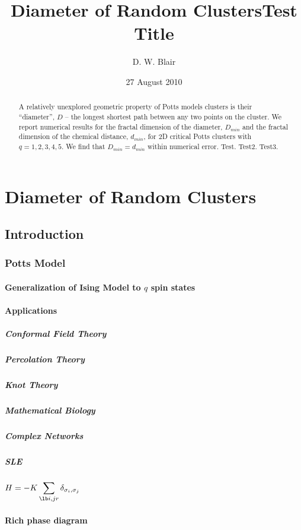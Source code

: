 \documentclass[pre,preprint]{revtex4-1}
\title{Diameter of Random Clusters}
\date{27 August 2010}
\begin{document}
\begin{abstract}
 A relatively unexplored geometric property of Potts models clusters is their ``diameter'', $D$ -- the longest shortest path between any two points on the cluster. We report numerical results for the fractal dimension of the diameter, $D_{min}$ and the fractal dimension of the chemical distance, $d_{min}$, for 2D critical Potts clusters with $q=1,2,3,4,5$. We find that $D_{min} = d_{min}$ within numerical error. Test. Test2. Test3.
\end{abstract}

\title {Test Title}
\author{D. W. Blair}
\maketitle
\section{Diameter of Random Clusters}
\label{sec-1}
\subsection{Introduction}
\label{sec-1.1}
\subsubsection{Potts Model \cite{Wu82}}
\label{sec-1.1.1}
\paragraph{Generalization of Ising Model to $q$ spin states}
\label{sec-1.1.1.1}
\paragraph{Applications}
\label{sec-1.1.1.2}
\subparagraph{Conformal Field Theory}
\label{sec-1.1.1.2.1}
\subparagraph{Percolation Theory}
\label{sec-1.1.1.2.2}
\subparagraph{Knot Theory}
\label{sec-1.1.1.2.3}
\subparagraph{Mathematical Biology}
\label{sec-1.1.1.2.4}
\subparagraph{Complex Networks}
\label{sec-1.1.1.2.5}
\subparagraph{SLE}
\label{sec-1.1.1.2.6}
\paragraph{$H=-K \displaystyle\sum_{\lb i,j r} \delta_{\sigma_i, \sigma_j}$}
\label{sec-1.1.1.3}
\paragraph{Rich phase diagram}
\label{sec-1.1.1.4}
\end{document}
